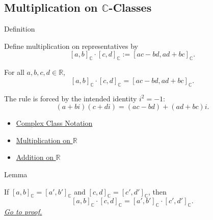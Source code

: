 \subsection*{\texorpdfstring{Multiplication on $\mathbb{C}$-Classes}{Multiplication on C-Classes}}

\begin{definitionbox}{Definition}
\begin{definition}
\label{def:multiplication-on-c-classes}
Define multiplication on representatives by
\[
[a,b]_{\mathbb{C}}\cdot[c,d]_{\mathbb{C}}
:=[ac-bd,ad+bc]_{\mathbb{C}}.
\]
\end{definition}
\end{definitionbox}


\begin{remark*}
For all $a,b,c,d\in\mathbb{R}$,
\[
[a,b]_{\mathbb{C}}\cdot[c,d]_{\mathbb{C}}
=[ac-bd,ad+bc]_{\mathbb{C}}.
\]
\end{remark*}

\begin{remark*}[Interpretation]
The rule is forced by the intended identity \(i^2=-1\):
\[
(a+bi)(c+di)=(ac-bd)+(ad+bc)i.
\]
\end{remark*}

\begin{dependencies}
\begin{itemize}
  \item \hyperref[def:complex-class-notation]{Complex Class Notation}
  \item \hyperref[def:multiplication-on-r]{Multiplication on $\mathbb{R}$
}
  \item \hyperref[def:addition-on-r]{Addition on $\mathbb{R}$}
\end{itemize}
\end{dependencies}

\begin{lemmabox}{Lemma}
\begin{lemma}
\label{lem:multiplication-on-c-respects-equivalence}
If $[a,b]_{\mathbb{C}}=[a',b']_{\mathbb{C}}$ and
$[c,d]_{\mathbb{C}}=[c',d']_{\mathbb{C}}$, then
\[
[a,b]_{\mathbb{C}}\cdot[c,d]_{\mathbb{C}}
=
[a',b']_{\mathbb{C}}\cdot[c',d']_{\mathbb{C}}.
\]
\hyperref[prf:multiplication-on-c-respects-equivalence]{\textit{Go to proof.}}
\end{lemma}
\end{lemmabox}

